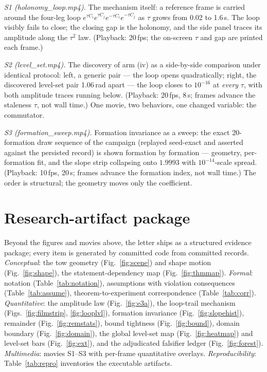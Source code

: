 \documentclass[letterpaper, 10pt, journal]{IEEEtran}
\begin{document}
\emph{S1 (holonomy\_loop.mp4).} The mechanism itself: a reference frame is
carried around the four-leg loop $e^{\tau C_i} e^{\tau C_j} e^{-\tau C_i}
e^{-\tau C_j}$ as $\tau$ grows from 0.02 to 1.6\,s. The loop visibly fails to
close; the closing gap is the holonomy, and the side panel traces its
amplitude along the $\tau^2$ law. (Playback: 20\,fps; the on-screen $\tau$
and gap are printed each frame.)

\emph{S2 (level\_set.mp4).} The discovery of arm (iv) as a side-by-side
comparison under identical protocol: left, a generic pair --- the loop opens
quadratically; right, the discovered level-set pair 1.06\,rad apart --- the
loop closes to $10^{-16}$ at \emph{every} $\tau$, with both amplitude traces
running below. (Playback: 20\,fps, 8\,s; frames advance the staleness
$\tau$, not wall time.) One movie, two behaviors, one changed variable: the
commutator.

\emph{S3 (formation\_sweep.mp4).} Formation invariance as a sweep: the exact
20-formation draw sequence of the campaign (replayed seed-exact and asserted
against the persisted record) is shown formation by formation --- geometry,
per-formation fit, and the slope strip collapsing onto $1.9993$ with
$10^{-14}$-scale spread. (Playback: 10\,fps, 20\,s; frames advance the
formation index, not wall time.) The order is structural; the geometry moves
only the coefficient.

\section{Research-artifact package}
Beyond the figures and movies above, the letter ships as a structured
evidence package; every item is generated by committed code from committed
records.
\emph{Conceptual}: the tow geometry (Fig.~\ref{fig:scene}) and shape motion
(Fig.~\ref{fig:shape}), the statement-dependency map
(Fig.~\ref{fig:thmmap}). \emph{Formal}: notation
(Table~\ref{tab:notation}), assumptions with violation consequences
(Table~\ref{tab:assume}), theorem-to-experiment correspondence
(Table~\ref{tab:corr}). \emph{Quantitative}: the amplitude law
(Fig.~\ref{fig:e3a}), the loop-trail mechanism (Figs.~\ref{fig:filmstrip},
\ref{fig:looplvl}), formation invariance (Fig.~\ref{fig:slopehist}),
remainder (Fig.~\ref{fig:remstats}), bound tightness
(Fig.~\ref{fig:bound}), domain boundary (Fig.~\ref{fig:domain}), the global
level-set map (Fig.~\ref{fig:heatmap}) and level-set bars
(Fig.~\ref{fig:ext}), and the adjudicated falsifier ledger
(Fig.~\ref{fig:forest}). \emph{Multimedia}:
movies S1--S3 with per-frame quantitative overlays. \emph{Reproducibility}:
Table~\ref{tab:repro} inventories the executable artifacts.
\end{document}
